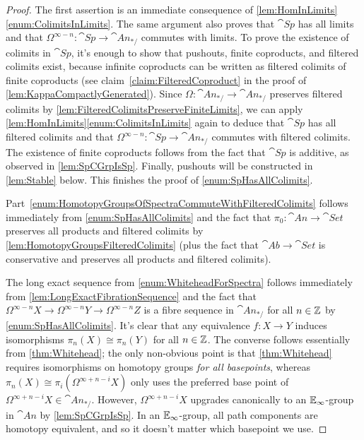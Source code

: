 \begin{proof}
	The first assertion is an immediate consequence of \cref{lem:HomInLimits}\cref{enum:ColimitsInLimits}. The same argument also proves that $\cat{Sp}$ has all limits and that $\Omega^{\infty-n}\colon \cat{Sp}\rightarrow\cat{An}_{*/}$ commutes with limits. To prove the existence of colimits in $\cat{Sp}$, it's enough to show that pushouts, finite coproducts, and filtered colimits exist, because infinite coproducts can be written as filtered colimits of finite coproducts (see claim~\cref{claim:FilteredCoproduct} in the proof of \cref{lem:KappaCompactlyGenerated}). Since $\Omega\colon \cat{An}_{*/}\rightarrow \cat{An}_{*/}$ preserves filtered colimits by \cref{lem:FilteredColimitsPreserveFiniteLimits}, we can apply \cref{lem:HomInLimits}\cref{enum:ColimitsInLimits} again to deduce that $\cat{Sp}$ has all filtered colimits and that $\Omega^{\infty-n}\colon \cat{Sp}\rightarrow\cat{An}_{*/}$ commutes with filtered colimits. The existence of finite coproducts follows from the fact that $\cat{Sp}$ is additive, as observed in \cref{lem:SpCGrpIsSp}. Finally, pushouts will be constructed in \cref{lem:Stable} below. This finishes the proof of \cref{enum:SpHasAllColimits}.
	
	Part~\cref{enum:HomotopyGroupsOfSpectraCommuteWithFilteredColimits} follows immediately from \cref{enum:SpHasAllColimits} and the fact that $\pi_0\colon \cat{An}\rightarrow \cat{Set}$ preserves all products and filtered colimits by \cref{lem:HomotopyGroupsFilteredColimits} (plus the fact that $\cat{Ab}\rightarrow\cat{Set}$ is conservative and preserves all products and filtered colimits).
	
	The long exact sequence from \cref{enum:WhiteheadForSpectra} follows immediately from \cref{lem:LongExactFibrationSequence} and the fact that $\Omega^{\infty-n}X\rightarrow \Omega^{\infty-n}Y\rightarrow \Omega^{\infty-n}Z$ is a fibre sequence in $\cat{An}_{*/}$ for all $n\in\mathbb{Z}$ by \cref{enum:SpHasAllColimits}. It's clear that any equivalence $f\colon X\rightarrow Y$ induces isomorphisms $\pi_n(X)\cong \pi_n(Y)$ for all $n\in\mathbb{Z}$. The converse follows essentially from \cref{thm:Whitehead}; the only non-obvious point is that \cref{thm:Whitehead} requires isomorphisms on homotopy groups \emph{for all basepoints}, whereas $\pi_n(X)\cong \pi_i(\Omega^{\infty+n-i}X)$ only uses the preferred base point of $\Omega^{\infty+n-i}X\in\cat{An}_{*/}$. However, $\Omega^{\infty+n-i}X$ upgrades canonically to an $\mathbb{E}_\infty$-group in $\cat{An}$ by \cref{lem:SpCGrpIsSp}. In an $\mathbb{E}_\infty$-group, all path components are homotopy equivalent, and so it doesn't matter which basepoint we use.
\end{proof}
